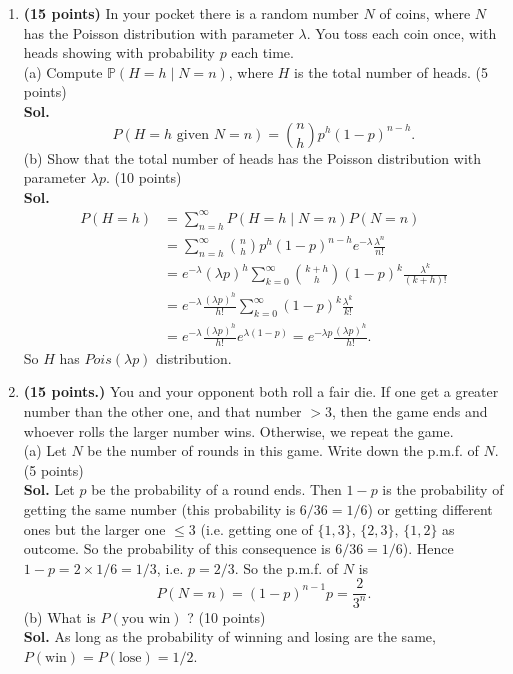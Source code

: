 \documentclass[12pt]{article}
\begin{document}
\begin{enumerate}
    \item \textbf{(15 points)} In your pocket there is a random number $N$ of coins, where $N$ has the Poisson distribution with parameter $\lambda$. You toss each coin once, with heads showing with probability $p$ each time.\\
    (a) Compute $\mathbb{P}(H=h\mid N=n)$, where $H$ is the total number of heads. (5 points) \\
    \textbf{Sol.}
    \begin{equation*}
    P(H=h \text{ given } N=n)=\binom{n}{h}p^h(1-p)^{n-h}.
    \end{equation*}
    (b) Show that the total number of heads has the Poisson distribution with parameter $\lambda p$. (10 points) \\
    \textbf{Sol.}
    \begin{equation*}
    \begin{aligned}
    P(H=h)&=\sum_{n=h}^\infty P(H=h\mid N=n)P(N=n) \\&
    =\sum_{n=h}^\infty 
    \binom{n}{h}p^h(1-p)^{n-h}e^{-\lambda}\frac{\lambda^n}{n!} \\&
    =e^{-\lambda}(\lambda p)^h\sum_{k=0}^\infty\binom{k+h}{h}(1-p)^{k}\frac{\lambda^k}{(k+h)!} \\&
    =e^{-\lambda}\frac{(\lambda p)^h}{h!}\sum_{k=0}^\infty(1-p)^{k}\frac{\lambda^k}{k!} \\&
    =e^{-\lambda}\frac{(\lambda p)^h}{h!}e^{\lambda(1-p)}=e^{-\lambda p}\frac{(\lambda p)^h}{h!}.
    \end{aligned}
    \end{equation*}
    So $H$ has $Pois(\lambda p)$ distribution.
    \item \textbf{(15 points.)} You and your opponent both roll a fair die. If one get a greater number than the other one, and that number $>3$, then the game ends and whoever rolls the larger number wins. Otherwise, we repeat the game.\\
    (a) Let $N$ be the number of rounds in this game. Write down the p.m.f. of $N$. (5 points) \\
    \textbf{Sol.} Let $p$ be the probability of a round ends. Then $1-p$ is the probability of getting the same number (this probability is $6/36=1/6$) or getting different ones but the larger one $\leq 3$ (i.e. getting one of $\{1,3\},\,\{2,3\},\,\{1,2\}$ as outcome. So the probability of this consequence is $6/36=1/6$). Hence $1-p=2\times 1/6=1/3$, i.e. $p=2/3$. So the p.m.f. of $N$ is
    \begin{equation*}
    P(N=n)=(1-p)^{n-1}p=\frac{2}{3^n}.
    \end{equation*}
    (b) What is $P(\text{you win})$ ? (10 points)\\
    \textbf{Sol.} As long as the probability of winning and losing are the same, $P(\text{win})=P(\text{lose})=1/2$.


\end{enumerate}
\end{document}
